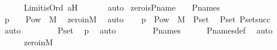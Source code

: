 \begin{isabellebody}
\ \ \ \ \isamarkupfalse%
\ Limit{\isacharunderscore}{\kern0pt}is{\isacharunderscore}{\kern0pt}Ord\ aH\ \isanewline
\ \ \ \ \isamarkupfalse%
\ auto\isanewline
{}\isamarkupfalse%
%
\endisatagproof
{\isafoldproof}%
%
\isadelimproof
\isanewline
%
\endisadelimproof
\isanewline
{}\isamarkupfalse%
\ zero{\isacharunderscore}{\kern0pt}is{\isacharunderscore}{\kern0pt}P{\isacharunderscore}{\kern0pt}name\ {\isacharcolon}{\kern0pt}\ {\isachardoublequoteopen}{}\ {\isasymin}\ P{\isacharunderscore}{\kern0pt}names{\isachardoublequoteclose}\ \isanewline
%
\isadelimproof
%
\endisadelimproof
%
\isatagproof
{}\isamarkupfalse%
\ {\isacharminus}{\kern0pt}\ \isanewline
\ \ \isamarkupfalse%
\ p{}\ {\isacharcolon}{\kern0pt}\ {\isachardoublequoteopen}{}\ {\isasymin}\ Pow{\isacharparenleft}{\kern0pt}{}{\isacharparenright}{\kern0pt}\ {\isasyminter}\ M{\isachardoublequoteclose}\ \isamarkupfalse%
\ zero{\isacharunderscore}{\kern0pt}in{\isacharunderscore}{\kern0pt}M\ \isamarkupfalse%
\ auto\isanewline
\ \ \isamarkupfalse%
\ p{}\ {\isacharcolon}{\kern0pt}\ {\isachardoublequoteopen}Pow{\isacharparenleft}{\kern0pt}{}{\isacharparenright}{\kern0pt}\ {\isasyminter}\ M\ {\isacharequal}{\kern0pt}\ P{\isacharunderscore}{\kern0pt}set{\isacharparenleft}{\kern0pt}{}{\isacharparenright}{\kern0pt}{\isachardoublequoteclose}\ \isamarkupfalse%
\ P{\isacharunderscore}{\kern0pt}set{\isacharunderscore}{\kern0pt}{}\ P{\isacharunderscore}{\kern0pt}set{\isacharunderscore}{\kern0pt}succ\ \isamarkupfalse%
\ auto\ \isanewline
\ \ \isamarkupfalse%
\ \isamarkupfalse%
\ {\isachardoublequoteopen}{}\ {\isasymin}\ P{\isacharunderscore}{\kern0pt}set{\isacharparenleft}{\kern0pt}{}{\isacharparenright}{\kern0pt}{\isachardoublequoteclose}\ \isamarkupfalse%
\ p{}\ \isamarkupfalse%
\ auto\ \isanewline
\ \ \isamarkupfalse%
\ \isamarkupfalse%
\ {\isachardoublequoteopen}{}\ {\isasymin}\ P{\isacharunderscore}{\kern0pt}names{\isachardoublequoteclose}\isanewline
\ \ \ \ \isamarkupfalse%
\ P{\isacharunderscore}{\kern0pt}names{\isacharunderscore}{\kern0pt}def\ \isamarkupfalse%
\ auto\ \ \isanewline
\ \ \ \ \isamarkupfalse%
\ zero{\isacharunderscore}{\kern0pt}in{\isacharunderscore}{\kern0pt}M\ \isamarkupfalse%

\end{isabellebody}
